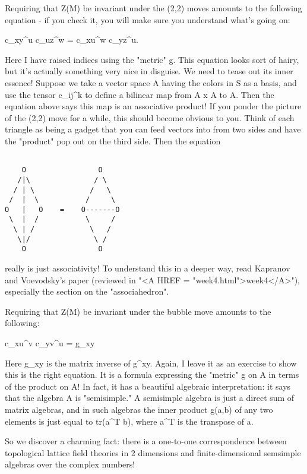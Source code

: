 Requiring that Z(M) be invariant under the (2,2) moves amounts to the
following equation - if you check it, you will make sure you understand
what's going on:

c_{xy}^u c_{uz}^w = c_{xu}^w c_{yz}^u.

Here I have raised indices using the "metric" g.  This equation looks
sort of hairy, but it's actually something very nice in disguise.  We
need to tease out its inner essence!  Suppose we take a vector space A
having the colors in S as a basis, and use the tensor c_{ij}^k to define
a bilinear map from A x A to A.  Then the equation above says this map
is an associative product!  If you ponder the picture of the (2,2) move
for a while, this should become obvious to you.  Think of each triangle
as being a gadget that you can feed vectors into from two sides and have
the "product" pop out on the third side.   Then the equation


\begin{verbatim}

    O                 O
   /|\               / \    
  / | \             /   \  
 /  |  \           /     \ 
O   |   O    =    O-------O
 \  |  /           \     /   
  \ | /             \   /          
   \|/               \ /     
    O                 O
\end{verbatim}
    

really is just associativity!  To understand this in a deeper way, read
Kapranov and Voevodsky's paper (reviewed in "<A HREF = "week4.html">week4</A>"), especially the
section on the "associahedron".  

Requiring that Z(M) be invariant under the bubble move amounts to the
following:

c_{xu}^v c_{yv}^u = g_{xy}

Here g_{xy} is the matrix inverse of g^{xy}.  Again, I leave it as an
exercise to show this is the right equation.  It is a formula expressing
the "metric" g on A in terms of the product on A!   In fact, it has a
beautiful algebraic interpretation: it says that the algebra A is
"semisimple."   A semisimple algebra is just a direct sum of matrix
algebras, and in such algebras the inner product g(a,b) of any two
elements is just equal to tr(a^T b), where a^T is the transpose of a.  

So we discover a charming fact: there is a one-to-one correspondence
between topological lattice field theories in 2 dimensions and
finite-dimensional semsimple algebras over the complex numbers!   

